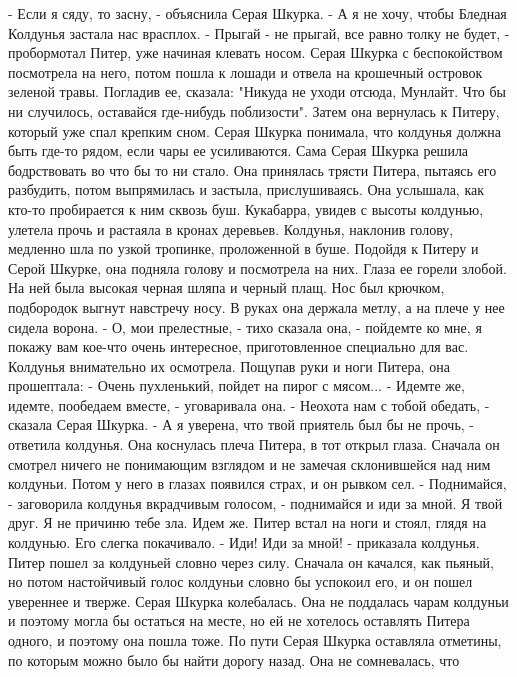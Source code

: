     - Если я сяду, то засну, - объяснила Серая Шкурка. - А я не хочу, 
чтобы Бледная Колдунья застала нас врасплох.
    - Прыгай - не прыгай, все равно толку не будет, - пробормотал 
Питер, уже начиная клевать носом.
    Серая Шкурка с беспокойством посмотрела на него, потом пошла к 
лошади и отвела на крошечный островок зеленой травы. Погладив ее, 
сказала: "Никуда не уходи отсюда, Мунлайт. Что бы ни случилось, 
оставайся где-нибудь поблизости".
    Затем она вернулась к Питеру, который уже спал крепким сном.
    Серая Шкурка понимала, что колдунья должна быть где-то рядом, если 
чары ее усиливаются. Сама Серая Шкурка решила бодрствовать во что бы 
то ни стало. Она принялась трясти Питера, пытаясь его разбудить, потом 
выпрямилась и застыла, прислушиваясь. Она услышала, как кто-то 
пробирается к ним сквозь буш.
    Кукабарра, увидев с высоты колдунью, улетела прочь и растаяла в 
кронах деревьев. Колдунья, наклонив голову, медленно шла по узкой 
тропинке, проложенной в буше. Подойдя к Питеру и Серой Шкурке, она 
подняла голову и посмотрела на них. Глаза ее горели злобой. На ней 
была высокая черная шляпа и черный плащ. Нос был крючком, подбородок 
выгнут навстречу носу. В руках она держала метлу, а на плече у нее 
сидела ворона.
    - О, мои прелестные, - тихо сказала она, - пойдемте ко мне, я 
покажу вам кое-что очень интересное, приготовленное специально для 
вас.
    Колдунья внимательно их осмотрела. Пощупав руки и ноги Питера, она 
прошептала:
    - Очень пухленький, пойдет на пирог с мясом...
    - Идемте же, идемте, пообедаем вместе, - уговаривала она.
    - Неохота нам с тобой обедать, - сказала Серая Шкурка.
    - А я уверена, что твой приятель был бы не прочь, - ответила 
колдунья. Она коснулась плеча Питера, в тот открыл глаза. Сначала он 
смотрел ничего не понимающим взглядом и не замечая склонившейся над 
ним колдуньи. Потом у него в глазах появился страх, и он рывком сел.
    - Поднимайся, - заговорила колдунья вкрадчивым голосом, - 
поднимайся и иди за мной. Я твой друг. Я не причиню тебе зла. Идем же.
    Питер встал на ноги и стоял, глядя на колдунью. Его слегка 
покачивало.
    - Иди! Иди за мной! - приказала колдунья.
    Питер пошел за колдуньей словно через силу. Сначала он качался, 
как пьяный, но потом настойчивый голос колдуньи словно бы успокоил 
его, и он пошел увереннее и тверже.
    Серая Шкурка колебалась. Она не поддалась чарам колдуньи и поэтому 
могла бы остаться на месте, но ей не хотелось оставлять Питера одного, 
и поэтому она пошла тоже. По пути Серая Шкурка оставляла отметины, по 
которым можно было бы найти дорогу назад. Она не сомневалась, что 
